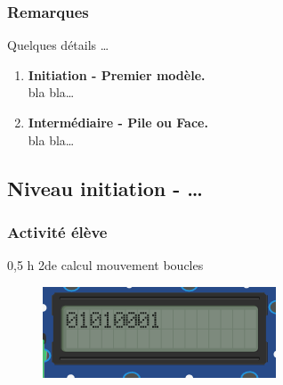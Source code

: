 \subsubsection{Remarques}


\begin{methode}
    Quelques détails
    \ldots %

    \begin{enumerate}
        \item \textbf{Initiation - Premier modèle.} \\
            bla bla\ldots %
        \item \textbf{Intermédiaire - Pile ou Face.}\\
            bla bla\ldots %
    \end{enumerate}
\end{methode}

%
%

\newpage

\subsection{Niveau initiation - \ldots}

\subsubsection{Activité élève}

\cartouche
{0,5 h}         %
{2de}           %
{calcul}        %
{mouvement}     %
{boucles}       %


\begin{figure}
    \includegraphics[width=\linewidth]{res/st-pf-00.png}
\end{figure}

